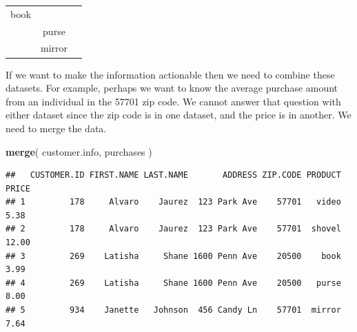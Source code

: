 \documentclass[]{book}
\newenvironment{Shaded}{\begin{snugshade}}{\end{snugshade}}
\newcommand{\KeywordTok}[1]{\textcolor[rgb]{0.13,0.29,0.53}{\textbf{#1}}}
\newcommand{\NormalTok}[1]{#1}
\theoremstyle{definition}
\theoremstyle{definition}
\theoremstyle{definition}
\theoremstyle{remark}
\begin{document}
\begin{longtable}[]{@{}ccc@{}}
\begin{minipage}[t]{0.13\columnwidth}
book\strut
\end{minipage} & \begin{minipage}[t]{0.13\columnwidth}\centering
3.99\strut
\end{minipage}\tabularnewline
\begin{minipage}[t]{0.18\columnwidth}\centering
269\strut
\end{minipage} & \begin{minipage}[t]{0.13\columnwidth}\centering
purse\strut
\end{minipage} & \begin{minipage}[t]{0.13\columnwidth}\centering
8\strut
\end{minipage}\tabularnewline
\begin{minipage}[t]{0.18\columnwidth}\centering
934\strut
\end{minipage} & \begin{minipage}[t]{0.13\columnwidth}\centering
mirror\strut
\end{minipage} & \begin{minipage}[t]{0.13\columnwidth}\centering
7.64\strut
\end{minipage}\tabularnewline
\bottomrule
\end{longtable}

If we want to make the information actionable then we need to combine
these datasets. For example, perhaps we want to know the average
purchase amount from an individual in the 57701 zip code. We cannot
answer that question with either dataset since the zip code is in one
dataset, and the price is in another. We need to merge the data.

\begin{Shaded}
\begin{Highlighting}[]
\KeywordTok{merge}\NormalTok{( customer.info, purchases )   }
\end{Highlighting}
\end{Shaded}

\begin{verbatim}
##   CUSTOMER.ID FIRST.NAME LAST.NAME       ADDRESS ZIP.CODE PRODUCT PRICE
## 1         178     Alvaro    Jaurez  123 Park Ave    57701   video  5.38
## 2         178     Alvaro    Jaurez  123 Park Ave    57701  shovel 12.00
## 3         269    Latisha     Shane 1600 Penn Ave    20500    book  3.99
## 4         269    Latisha     Shane 1600 Penn Ave    20500   purse  8.00
## 5         934    Janette   Johnson  456 Candy Ln    57701  mirror  7.64
\end{verbatim}
\end{document}
